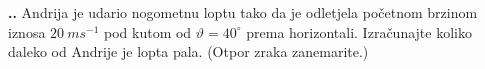 
\noindent 
\textbf{
\thecjelina.\thezadatak.}
Andrija je udario nogometnu loptu tako da je odletjela početnom brzinom iznosa $20\ ms^{-1}$  pod kutom od  $\vartheta=40^\circ$ prema horizontali. Izračunajte koliko daleko od Andrije je lopta pala. (Otpor zraka zanemarite.)

